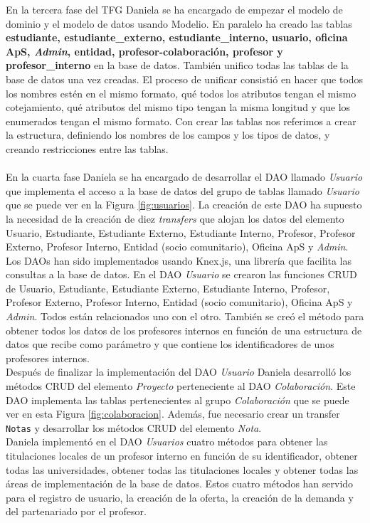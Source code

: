 \documentclass[11pt]{book}
\begin{document}
	En la tercera fase del TFG Daniela se ha encargado de empezar el modelo de dominio y el modelo de datos usando Modelio. En paralelo ha creado las tablas \textbf{estudiante, estudiante\_externo, estudiante\_interno, usuario, oficina ApS, \emph{Admin}, entidad, profesor-colaboración, profesor y profesor\_interno} en la base de datos. También unifico todas las tablas de la base de datos una vez creadas. El proceso de unificar consistió en hacer que todos los nombres estén en el mismo formato, qué todos los atributos tengan el mismo cotejamiento, qué atributos del mismo tipo tengan la misma longitud y que los enumerados tengan el mismo formato. Con crear las tablas nos referimos a crear la estructura, definiendo los nombres de los campos y los tipos de datos, y creando restricciones entre las tablas.\\\\
	En la cuarta fase Daniela se ha encargado de desarrollar el DAO llamado \textit{Usuario} que implementa el acceso a la base de datos del grupo de tablas llamado \textit{Usuario} que se puede ver en la Figura \ref{fig:usuarios}. La creación de este DAO ha supuesto la necesidad de la creación de diez \textit{transfers} que alojan los datos del elemento Usuario, Estudiante, Estudiante Externo, Estudiante Interno, Profesor, Profesor Externo, Profesor Interno, Entidad (socio comunitario), Oficina ApS y \emph{Admin}. Los DAOs han sido implementados usando Knex.js, una librería que facilita las consultas a la base de datos. En el DAO \textit{Usuario} se crearon las funciones CRUD de Usuario, Estudiante, Estudiante Externo, Estudiante Interno, Profesor, Profesor Externo, Profesor Interno, Entidad (socio comunitario), Oficina ApS y \emph{ Admin}. Todos están relacionados uno con el otro. También se creó el método para obtener todos los datos de los profesores internos en función de una estructura de datos que recibe como parámetro y que contiene los identificadores de unos profesores internos.\\
	Después de finalizar la implementación del DAO \textit{Usuario} Daniela desarrolló los métodos CRUD del elemento \textit{Proyecto} perteneciente al DAO \textit{Colaboración}. Este DAO implementa las tablas pertenecientes al grupo \textit{Colaboración} que se puede ver en esta Figura \ref{fig:colaboracion}. Además, fue necesario crear un transfer \texttt{Notas} y desarrollar los métodos CRUD del elemento \textit{Nota}.\\
	Daniela implementó en el DAO \textit{Usuarios} cuatro métodos para obtener las titulaciones locales de un profesor interno en función de su identificador, obtener todas las universidades, obtener todas las titulaciones locales y obtener todas las áreas de implementación de la base de datos. Estos cuatro métodos han servido para el registro de usuario, la creación de la oferta, la creación de la demanda y del partenariado por el profesor.\\
\end{document}
